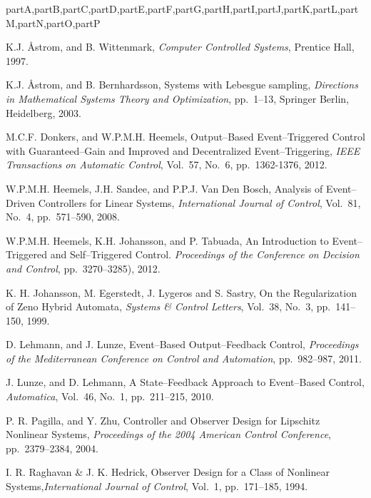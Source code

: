 \documentclass[letterpaper, 10 pt, conference]{ieeeconf}
\def\compile{partA,partB,partC,partD,partE,partF,partG,partH,partI,partJ,partK,partL,partM,partN,partO,partP}
\newenvironment{partP}[1][]{}{}
\begin{document}
\begin{xcomment}{\compile}
\begin{partP}
\begin{thebibliography}{99}
 K.J. \r{A}strom, and B. Wittenmark, {\sl Computer Controlled Systems}, Prentice Hall, 1997.

 K.J. \r{A}strom, and B. Bernhardsson, Systems with Lebesgue sampling, {\sl Directions in Mathematical Systems Theory and Optimization}, pp.~1--13, Springer Berlin, Heidelberg, 2003.





 M.C.F. Donkers, and W.P.M.H. Heemels, Output--Based Event--Triggered Control with Guaranteed--Gain and Improved and Decentralized Event--Triggering, {\sl IEEE Transactions on Automatic Control}, Vol.~57, No.~6, pp.~1362-1376, 2012.




 W.P.M.H. Heemels, J.H. Sandee, and P.P.J. Van Den Bosch, Analysis of Event--Driven Controllers for Linear Systems, {\sl International Journal of Control}, Vol.~81, No.~4, pp.~571--590, 2008.

 W.P.M.H. Heemels, K.H. Johansson, and P. Tabuada, An Introduction to Event--Triggered and Self--Triggered Control. {\sl Proceedings of the  Conference on Decision and Control}, pp.~3270--3285), 2012.



  K. H. Johansson, M. Egerstedt, J. Lygeros and S. Sastry, On the Regularization of Zeno Hybrid Automata, {\sl Systems \& Control Letters}, Vol.~38, No.~3, pp.~141--150, 1999.







 D. Lehmann, and J. Lunze, Event--Based Output--Feedback Control, {\sl Proceedings of the  Mediterranean Conference on Control and Automation}, pp.~982--987, 2011.

 J. Lunze, and D. Lehmann, A State--Feedback Approach to Event--Based Control, {\sl Automatica}, Vol.~46, No.~1, pp.~211--215, 2010.

 P. R. Pagilla, and Y. Zhu, Controller and Observer Design for Lipschitz Nonlinear Systems, {\sl Proceedings of the 2004 American Control Conference}, pp.~2379--2384, 2004.




 I. R. Raghavan \& J. K. Hedrick, Observer Design for a Class of Nonlinear Systems,{\sl International Journal of Control}, Vol.~1, pp.~171--185, 1994.



\end{thebibliography}
\end{partP}
\end{xcomment}
\end{document}
